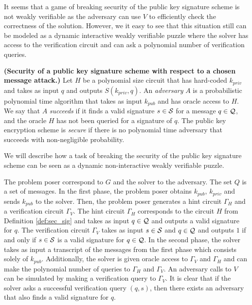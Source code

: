 It seems that a game of breaking security of the public key signature scheme is not weakly verifiable as the adversary can use $V$
to efficiently check the correctness of the solution. However, we it easy to see that this situation still can be modeled as
a dynamic interactive weakly verifiable puzzle where the solver has access to the verification circuit and can ask a polynomial number of verification queries.
%
\begin{definition}\textbf{(Security of a public key signature scheme with respect to a chosen message attack.)}
  \label{def:sec_sig}
Let $H$ be a polynomial size circuit that has hard-coded $k_{priv}$ and takes as input $q$ and outputs $S(k_{priv}, q)$.
An \textit{adversary} $A$ is a probabilistic polynomial time algorithm that takes as input $k_{pub}$ and has oracle access to $H$.
We say that $A$ \textit{succeeds} if it finds a valid signature $s \in \mathcal{S}$ for a message $q \in \mathcal{Q}$, and the oracle $H$ has not been queried for a signature of $q$.
The public key encryption scheme is \textit{secure} if there is no polynomial time adversary that succeeds with non-negligible probability.
\end{definition}
%
We will describe how a task of breaking the security of the public key signature scheme can be
seen as a dynamic non-interactive weakly verifiable puzzle.

The problem poser correspond to $G$ and the solver to the adversary. The set $Q$ is a set of messages.
In the first phase, the problem poser obtains $k_{pub}$, $k_{priv}$ and sends $k_{pub}$ to the solver.
Then, the problem poser generates a hint circuit $\Gamma_H$ and a verification circuit $\Gamma_V$.
The hint circuit $\Gamma_H$ corresponds to the circuit $H$ from Definition \ref{def:sec_sig} and takes as input $q \in \mathcal{Q}$ and outputs a valid signature for $q$.
The verification circuit $\Gamma_V$ takes as input $s \in \mathcal{S}$ and $q \in \mathcal{Q}$ and outputs $1$ if and only if $s \in \mathcal{S}$ is a valid signature for $q \in \mathcal{Q}$.
In the second phase, the solver takes as input a transcript of the messages from the first phase which consists solely of $k_{pub}$.
Additionally, the solver is given oracle access to $\Gamma_V$ and $\Gamma_H$ and can make the polynomial number of queries to $\Gamma_H$ and $\Gamma_V$.
An adversary calls to $V$ can be simulated by making a verification query to $\Gamma_V$.
It is clear that if the solver asks a successful verification query $(q,s)$,
then there exists an adversary that also finds a valid signature for $q$.

